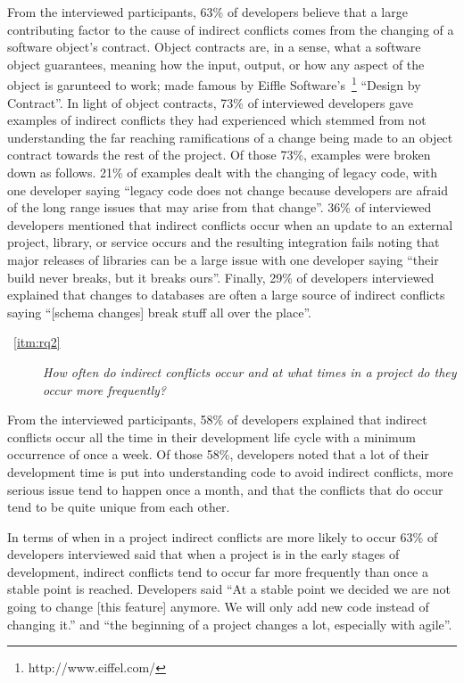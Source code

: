 \documentclass[conference]{IEEEtran}
\begin{document}
From the interviewed participants, 63\% of developers believe that a large contributing factor to the cause
of indirect conflicts comes from the changing of a software object's contract. Object contracts are, in a sense,
what a software object guarantees, meaning how the input, output, or how any aspect of the object is garunteed
to work; made famous by Eiffle Software's~\footnote{http://www.eiffel.com/} ``Design by Contract''\texttrademark. 
In light of object contracts, 73\% of interviewed developers gave examples of indirect conflicts they had experienced
which stemmed from not understanding the far reaching ramifications of a change being made to an object contract
towards the rest of the project. Of those 73\%, examples were broken down as follows. 21\% of examples dealt
with the changing of legacy code, with one developer saying ``legacy code does not change because developers 
are afraid of the long range issues that may arise from that change''. 36\% of interviewed developers mentioned 
that indirect conflicts occur when an update to an external project, library, or service occurs and the resulting 
integration fails noting that major releases of libraries can be a large issue with one developer saying 
``their build never breaks, but it breaks ours''. Finally, 29\% of developers interviewed explained that changes to
databases are often a large source of indirect conflicts saying ``[schema changes] break stuff all over the place''.

\begin{description}
	\item[~\ref{itm:rq2}] \textit{How often do indirect conflicts occur and at what times in a project do they occur more frequently?}
\end{description}

From the interviewed participants, 58\% of developers explained that indirect conflicts occur all the time in
their development life cycle with a minimum occurrence of once a week. Of those 58\%, developers noted that a
lot of their development time is put into understanding code to avoid indirect conflicts, more serious issue tend
to happen once a month, and that the conflicts that do occur tend to be quite unique from each other.

In terms of when in a project indirect conflicts are more likely to occur 63\% of developers interviewed said that
when a project is in the early stages of development, indirect conflicts tend to occur far more frequently
than once a stable point is reached. Developers said ``At a stable point we decided we are not going to change
[this feature] anymore. We will only add new code instead of changing it.'' and ``the beginning of a project 
changes a lot, especially with agile''.
\end{document}
